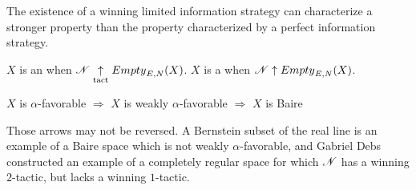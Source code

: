 The existence of a winning limited information strategy can characterize a
stronger property than the property characterized by a perfect information
strategy.

\begin{defn}
  $X$ is an 
  when $\mathscr{N} \underset{\text{tact}}{\uparrow} {Empty}_{E,N}(X)$.
  $X$ is a 
  when $\mathscr{N} \uparrow {Empty}_{E,N}(X)$.
\end{defn}

\begin{prop}
  $X$ is $\alpha$-favorable
    $\Rightarrow$
  $X$ is weakly $\alpha$-favorable
    $\Rightarrow$
  $X$ is Baire
\end{prop}

Those arrows may not be reversed. A Bernstein subset of the real line is an
example of a Baire space which is not weakly $\alpha$-favorable, and Gabriel
Debs constructed an example of a completely regular space for which $\mathscr{N}$
has a winning $2$-tactic, but lacks a winning $1$-tactic. \cite{MR817083}
